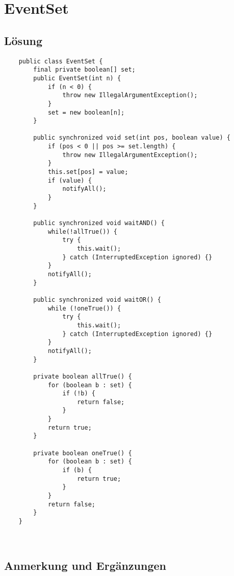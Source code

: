 \section{EventSet}\label{ch:eventset}


\subsection{Lösung}

\begin{verbatim}
    public class EventSet {
        final private boolean[] set;
        public EventSet(int n) {
            if (n < 0) {
                throw new IllegalArgumentException();
            }
            set = new boolean[n];
        }

        public synchronized void set(int pos, boolean value) {
            if (pos < 0 || pos >= set.length) {
                throw new IllegalArgumentException();
            }
            this.set[pos] = value;
            if (value) {
                notifyAll();
            }
        }

        public synchronized void waitAND() {
            while(!allTrue()) {
                try {
                    this.wait();
                } catch (InterruptedException ignored) {}
            }
            notifyAll();
        }

        public synchronized void waitOR() {
            while (!oneTrue()) {
                try {
                    this.wait();
                } catch (InterruptedException ignored) {}
            }
            notifyAll();
        }

        private boolean allTrue() {
            for (boolean b : set) {
                if (!b) {
                    return false;
                }
            }
            return true;
        }

        private boolean oneTrue() {
            for (boolean b : set) {
                if (b) {
                    return true;
                }
            }
            return false;
        }
    }
\end{verbatim}\\


\subsection{Anmerkung und Ergänzungen}

